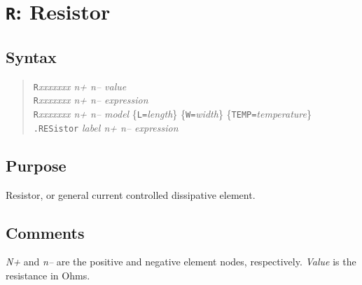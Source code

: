 %
%
%
%
\section{{\tt R}: Resistor}
\subsection{Syntax}
\begin{verse}
  {\tt R}{\it xxxxxxx n+ n-- value}\\
  {\tt R}{\it xxxxxxx n+ n-- expression}\\
  {\tt R}{\it xxxxxxx n+ n-- model} \{{\tt L=}{\it length}\}
        \{{\tt W=}{\it width}\} \{{\tt TEMP=}{\it temperature}\} \\
  {\tt .RESistor} {\it label n+ n-- expression}
\end{verse}
\subsection{Purpose}

Resistor, or general current controlled dissipative element.
\subsection{Comments}

{\it N+} and {\it n--} are the positive and negative element nodes,
respectively.  {\it Value} is the resistance in Ohms.

